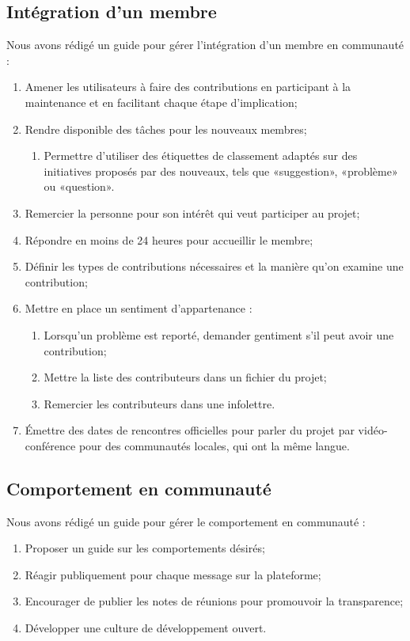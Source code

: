 \subsection{Intégration d’un membre}

Nous avons rédigé un guide pour gérer l'intégration d'un membre en communauté : 
\begin{enumerate}
    \item Amener les utilisateurs à faire des contributions en participant à la maintenance et en facilitant chaque étape d'implication;
    \item Rendre disponible des tâches pour les nouveaux membres;
    \begin{enumerate}
        \item Permettre d'utiliser des étiquettes de classement adaptés sur des initiatives proposés par des nouveaux, tels que «suggestion», «problème» ou «question».
    \end{enumerate}
    \item Remercier la personne pour son intérêt qui veut participer au projet;
    \item Répondre en moins de 24 heures pour accueillir le membre;
    \item Définir les types de contributions nécessaires et la manière qu'on examine une contribution;
    \item Mettre en place un sentiment d'appartenance :
    \begin{enumerate}
        \item Lorsqu'un problème est reporté, demander gentiment s'il peut avoir une contribution;
        \item Mettre la liste des contributeurs dans un fichier du projet;
        \item Remercier les contributeurs dans une infolettre.
    \end{enumerate}
    \item Émettre des dates de rencontres officielles pour parler du projet par vidéo-conférence pour des communautés locales, qui ont la même langue.
\end{enumerate}

\subsection{Comportement en communauté}

Nous avons rédigé un guide pour gérer le comportement en communauté : 
\begin{enumerate}
    \item Proposer un guide sur les comportements désirés;
    \item Réagir publiquement pour chaque message sur la plateforme;
    \item Encourager de publier les notes de réunions pour promouvoir la transparence;
    \item Développer une culture de développement ouvert.
\end{enumerate}

